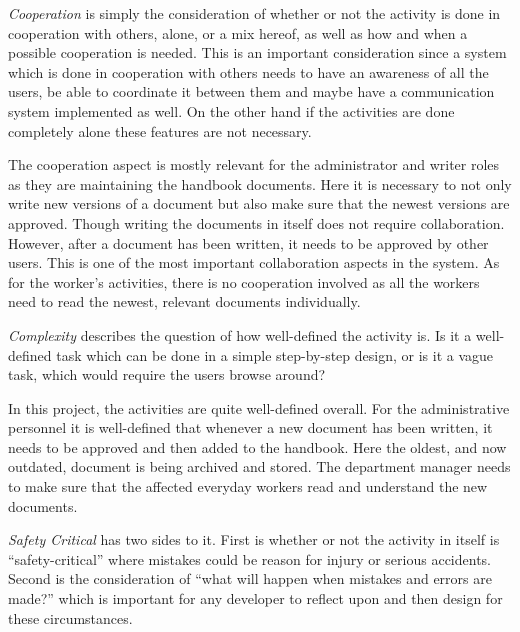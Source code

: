 
\textit{Cooperation} is simply the consideration of whether or not the activity is done in cooperation with others, alone, or a mix hereof, as well as how and when a possible cooperation is needed.
This is an important consideration since a system which is done in cooperation with others needs to have an awareness of all the users, be able to coordinate it between them and maybe have a communication system implemented as well.
On the other hand if the activities are done completely alone these features are not necessary.

The cooperation aspect is mostly relevant for the administrator and writer roles as they are maintaining the handbook documents.
Here it is necessary to not only write new versions of a document but also make sure that the newest versions are approved.
Though writing the documents in itself does not require collaboration. However, after a document has been written, it needs to be approved by other users. This is one of the most important collaboration aspects in the system.
As for the worker's activities, there is no cooperation involved as all the workers need to read the newest, relevant documents individually.

\textit{Complexity} describes the question of how well-defined the activity is.
Is it a well-defined task which can be done in a simple step-by-step design,
or is it a vague task, which would require the users browse around?

In this project, the activities are quite well-defined overall.
For the administrative personnel it is well-defined that whenever a new document has been written, it needs to be approved and then added to the handbook.
Here the oldest, and now outdated, document is being archived and stored.
The department manager needs to make sure that the affected everyday workers read and understand the new documents.

\textit{Safety Critical} has two sides to it.
First is whether or not the activity in itself is ``safety-critical'' where mistakes could be reason for injury or serious accidents.
Second is the consideration of ``what will happen when mistakes and errors are made?'' which is important for any developer to reflect upon and then design for these circumstances.

